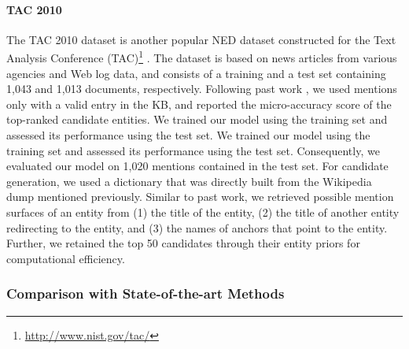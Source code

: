\documentclass[11pt,letterpaper]{article}
\begin{document}
\paragraph*{TAC 2010}

The TAC 2010 dataset is another popular NED dataset constructed for the Text Analysis Conference (TAC)\footnote{\url{http://www.nist.gov/tac/}} \cite{Ji2010}.
The dataset is based on news articles from various agencies and Web log data, and consists of a training and a test set containing 1,043 and 1,013 documents, respectively.
Following past work \cite{he-EtAl:2013:Short,TACL494}, we used mentions only with a valid entry in the KB, and reported the micro-accuracy score of the top-ranked candidate entities. We trained our model using the training set and assessed its performance using the test set.
We trained our model using the training set and assessed its performance using the test set.
Consequently, we evaluated our model on 1,020 mentions contained in the test set.
For candidate generation, we used a dictionary that was directly built from the Wikipedia dump mentioned previously.
Similar to past work, we retrieved possible mention surfaces of an entity from (1) the title of the entity, (2) the title of another entity redirecting to the entity, and (3) the names of anchors that point to the entity.
Further, we retained the top 50 candidates through their entity priors for computational efficiency.

\subsubsection{Comparison with State-of-the-art Methods}
\end{document}

